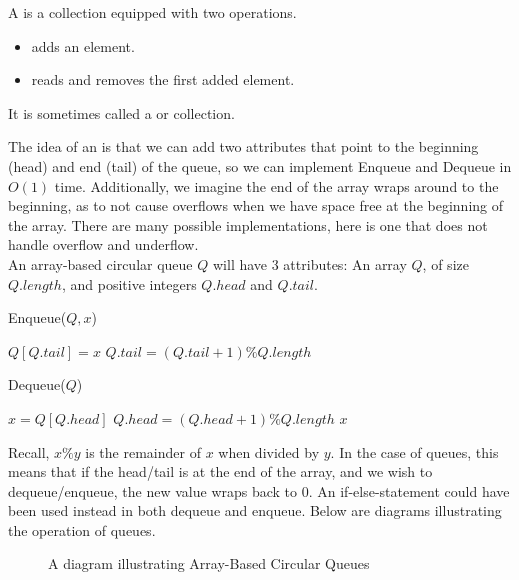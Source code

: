 \documentclass[11pt]{report}
\begin{document}
\begin{defi}[Queue]
    A  is a collection equipped with two operations.
    \begin{itemize}
        \item {} adds an element.
        \item {} reads and removes the first added element.
    \end{itemize}
    It is sometimes called a  or  collection. 
\end{defi}
\begin{impl}
    The idea of an  is that we can add two attributes that point to the beginning (head) and end (tail) of the queue, so we can implement Enqueue and Dequeue in $O(1)$ time. Additionally, we imagine the end of the array wraps around to the beginning, as to not cause overflows when we have space free at the beginning of the array. There are many possible implementations, here is one that does not handle overflow and underflow.
    \\ An array-based circular queue $Q$ will have 3 attributes: An array $Q$, of size $Q.length$, and positive integers $Q.head$ and $Q.tail$.\mypar
    \begin{algorithm}[H]
        \caption{Enqueue($Q, x$)}
        $Q[Q.tail] = x$\;
        $Q.tail = (Q.tail + 1)\%Q.length$\;
    \end{algorithm}
    \begin{algorithm}[H]
        \caption{Dequeue($Q$)}
        $x = Q[Q.head]$\;
        $Q.head = (Q.head + 1)\%Q.length$\;
        \Return $x$\;
    \end{algorithm}
    Recall, $x\%y$ is the remainder of $x$ when divided by $y$. In the case of queues, this means that if the head/tail is at the end of the array, and we wish to dequeue/enqueue, the new value wraps back to 0. An if-else-statement could have been used instead in both dequeue and enqueue.
    \mypar Below are diagrams illustrating the operation of queues.
    \begin{figure}[H]
        \caption{A diagram illustrating Array-Based Circular Queues}
        \centering
\end{figure}
\end{impl}
\end{document}
